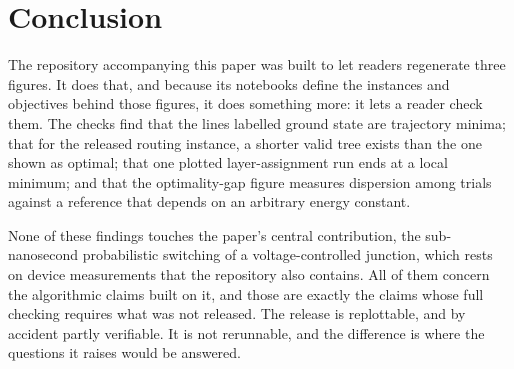 \documentclass[11pt]{article}
\theoremstyle{definition}
\theoremstyle{remark}
\begin{document}
\section{Conclusion}

The repository accompanying this paper was built to let readers regenerate three figures. It does that, and because its notebooks define the instances and objectives behind those figures, it does something more: it lets a reader check them. The checks find that the lines labelled ground state are trajectory minima; that for the released routing instance, a shorter valid tree exists than the one shown as optimal; that one plotted layer-assignment run ends at a local minimum; and that the optimality-gap figure measures dispersion among trials against a reference that depends on an arbitrary energy constant.

None of these findings touches the paper's central contribution, the sub-nanosecond probabilistic switching of a voltage-controlled junction, which rests on device measurements that the repository also contains. All of them concern the algorithmic claims built on it, and those are exactly the claims whose full checking requires what was not released. The release is replottable, and by accident partly verifiable. It is not rerunnable, and the difference is where the questions it raises would be answered.
\end{document}
